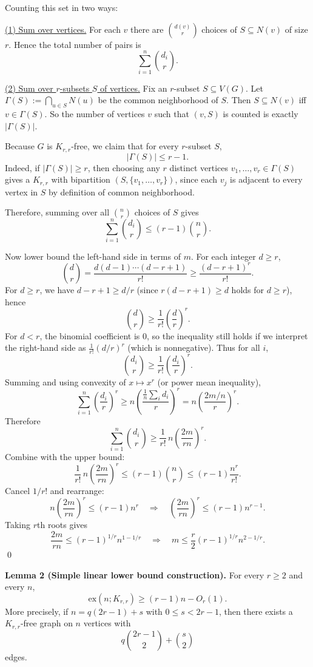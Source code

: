 Counting this set in two ways:

\underline{(1) Sum over vertices.}
For each $v$ there are $\binom{d(v)}{r}$ choices of $S\subseteq N(v)$ of size $r$. Hence the total number of pairs is
\[
\sum_{i=1}^n \binom{d_i}{r}.
\]

\underline{(2) Sum over $r$-subsets $S$ of vertices.}
Fix an $r$-subset $S\subseteq V(G)$. Let $\Gamma(S):=\bigcap_{u\in S} N(u)$ be the common neighborhood of $S$.
Then $S\subseteq N(v)$ iff $v\in\Gamma(S)$. So the number of vertices $v$ such that $(v,S)$ is counted is exactly $|\Gamma(S)|$.

Because $G$ is $K_{r,r}$-free, we claim that for every $r$-subset $S$,
\[
|\Gamma(S)|\le r-1.
\]
Indeed, if $|\Gamma(S)|\ge r$, then choosing any $r$ distinct vertices $v_1,\dots,v_r\in\Gamma(S)$ gives a $K_{r,r}$ with bipartition $(S,\{v_1,\dots,v_r\})$, since each $v_j$ is adjacent to every vertex in $S$ by definition of common neighborhood.

Therefore, summing over all $\binom{n}{r}$ choices of $S$ gives
\[
\sum_{i=1}^n \binom{d_i}{r} \le (r-1)\binom{n}{r}.
\]

Now lower bound the left-hand side in terms of $m$.
For each integer $d\ge r$,
\[
\binom{d}{r}=\frac{d(d-1)\cdots(d-r+1)}{r!}\ge \frac{(d-r+1)^r}{r!}.
\]
For $d\ge r$, we have $d-r+1\ge d/r$ (since $r(d-r+1)\ge d$ holds for $d\ge r$), hence
\[
\binom{d}{r} \ge \frac{1}{r!}\left(\frac{d}{r}\right)^r.
\]
For $d<r$, the binomial coefficient is $0$, so the inequality still holds if we interpret the right-hand side as $\frac{1}{r!}(d/r)^r$ (which is nonnegative).
Thus for all $i$,
\[
\binom{d_i}{r}\ge \frac{1}{r!}\left(\frac{d_i}{r}\right)^r.
\]
Summing and using convexity of $x\mapsto x^r$ (or power mean inequality),
\[
\sum_{i=1}^n \left(\frac{d_i}{r}\right)^r \ge n\left(\frac{\frac1n\sum_i d_i}{r}\right)^r = n\left(\frac{2m/n}{r}\right)^r.
\]
Therefore
\[
\sum_{i=1}^n \binom{d_i}{r} \ge \frac{1}{r!}\, n\left(\frac{2m}{rn}\right)^r.
\]
Combine with the upper bound:
\[
\frac{1}{r!}\, n\left(\frac{2m}{rn}\right)^r \le (r-1)\binom{n}{r} \le (r-1)\frac{n^r}{r!}.
\]
Cancel $1/r!$ and rearrange:
\[
 n\left(\frac{2m}{rn}\right)^r \le (r-1)n^r
\quad\Longrightarrow\quad
\left(\frac{2m}{rn}\right)^r \le (r-1)n^{r-1}.
\]
Taking $r$th roots gives
\[
\frac{2m}{rn} \le (r-1)^{1/r} n^{1-1/r}
\quad\Longrightarrow\quad
m \le \frac{r}{2}(r-1)^{1/r} n^{2-1/r}.
\]
\qed

\medskip
\textbf{Lemma 2 (Simple linear lower bound construction).}
For every $r\ge 2$ and every $n$,
\[
\mathrm{ex}(n;K_{r,r}) \ge (r-1)n - O_r(1).
\]
More precisely, if $n=q(2r-1)+s$ with $0\le s<2r-1$, then there exists a $K_{r,r}$-free graph on $n$ vertices with
\[
q\binom{2r-1}{2}+\binom{s}{2}
\]
edges.

